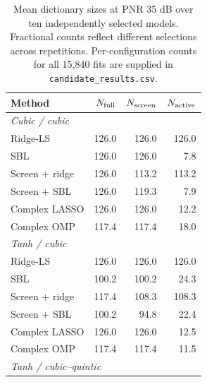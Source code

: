 \begin{table}[!t]

\caption{Mean dictionary sizes at PNR 35 dB over ten independently selected models. Fractional counts reflect different selections across repetitions. Per-configuration counts for all 15,840 fits are supplied in \texttt{candidate\_results.csv}.}

\label{tab:stage-counts}\centering\scriptsize

\begin{tabular}{lrrr}\toprule

Method & $N_{\rm full}$ & $N_{\rm screen}$ & $N_{\rm active}$\\\midrule

\multicolumn{4}{l}{\emph{Cubic / cubic}}\\

Ridge-LS & 126.0 & 126.0 & 126.0\\

SBL & 126.0 & 126.0 & 7.8\\

Screen + ridge & 126.0 & 113.2 & 113.2\\

Screen + SBL & 126.0 & 119.3 & 7.9\\

Complex LASSO & 126.0 & 126.0 & 12.2\\

Complex OMP & 117.4 & 117.4 & 18.0\\

\midrule

\multicolumn{4}{l}{\emph{Tanh / cubic}}\\

Ridge-LS & 126.0 & 126.0 & 126.0\\

SBL & 100.2 & 100.2 & 24.3\\

Screen + ridge & 117.4 & 108.3 & 108.3\\

Screen + SBL & 100.2 & 94.8 & 22.4\\

Complex LASSO & 126.0 & 126.0 & 12.5\\

Complex OMP & 117.4 & 117.4 & 11.5\\

\midrule

\multicolumn{4}{l}{\emph{Tanh / cubic--quintic}}\\


\end{tabular}
\end{table}
